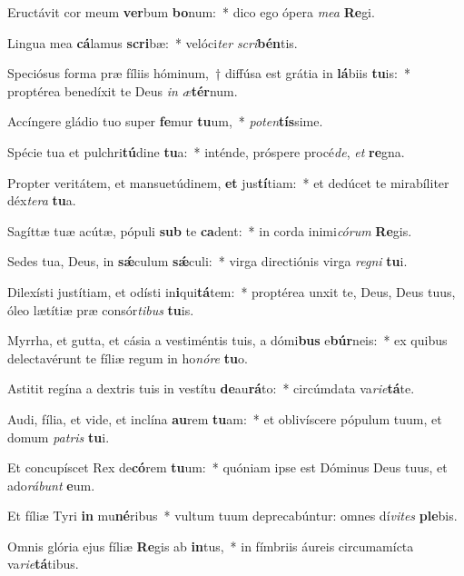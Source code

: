 \item Eructávit cor meum \textbf{ver}bum \textbf{bo}num:~* dico ego ópera \textit{me}\textit{a} \textbf{Re}gi.
\item Lingua mea \textbf{cá}lamus \textbf{scri}bæ:~* velóci\textit{ter} \textit{scri}\textbf{bén}tis.
\item Speciósus forma præ fíliis hóminum,~† diffúsa est grátia in \textbf{lá}biis \textbf{tu}is:~* proptérea benedíxit te Deus \textit{in} \textit{æ}\textbf{tér}num.
\item Accíngere gládio tuo super \textbf{fe}mur \textbf{tu}um,~* \textit{pot}\textit{en}\textbf{tís}sime.
\item Spécie tua et pulchri\textbf{tú}dine \textbf{tu}a:~* inténde, próspere procé\textit{de}, \textit{et} \textbf{re}gna.
\item Propter veritátem, et mansuetúdinem, \textbf{et} jus\textbf{tí}tiam:~* et dedúcet te mirabíliter déx\textit{te}\textit{ra} \textbf{tu}a.
\item Sagíttæ tuæ acútæ, pópuli \textbf{sub} te \textbf{ca}dent:~* in corda inimi\textit{có}\textit{rum} \textbf{Re}gis.
\item Sedes tua, Deus, in \textbf{sǽ}culum \textbf{sǽ}culi:~* virga directiónis virga \textit{re}\textit{gni} \textbf{tu}i.
\item Dilexísti justítiam, et odísti in\textbf{i}qui\textbf{tá}tem:~* proptérea unxit te, Deus, Deus tuus, óleo lætítiæ præ consór\textit{ti}\textit{bus} \textbf{tu}is.
\item Myrrha, et gutta, et cásia a vestiméntis tuis, a dómi\textbf{bus} e\textbf{búr}neis:~* ex quibus delectavérunt te fíliæ regum in ho\textit{nó}\textit{re} \textbf{tu}o.
\item Astitit regína a dextris tuis in vestítu \textbf{de}au\textbf{rá}to:~* circúmdata va\textit{ri}\textit{e}\textbf{tá}te.
\item Audi, fília, et vide, et inclína \textbf{au}rem \textbf{tu}am:~* et oblivíscere pópulum tuum, et domum \textit{pa}\textit{tris} \textbf{tu}i.
\item Et concupíscet Rex de\textbf{có}rem \textbf{tu}um:~* quóniam ipse est Dóminus Deus tuus, et ado\textit{rá}\textit{bunt} \textbf{e}um.
\item Et fíliæ Tyri \textbf{in} mu\textbf{né}ribus~* vultum tuum deprecabúntur: omnes dí\textit{vi}\textit{tes} \textbf{ple}bis.
\item Omnis glória ejus fíliæ \textbf{Re}gis ab \textbf{in}tus,~* in fímbriis áureis circumamícta va\textit{ri}\textit{e}\textbf{tá}tibus.
